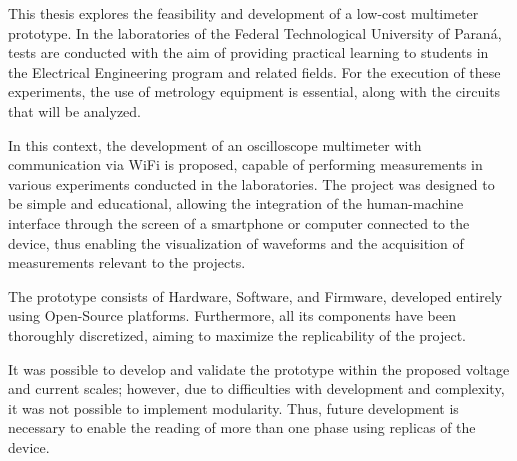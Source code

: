 
\begin{abstractutfpr}%
This thesis explores the feasibility and development of a low-cost multimeter prototype. In the laboratories of the Federal Technological University of Paraná, tests are conducted with the aim of providing practical learning to students in the Electrical Engineering program and related fields. For the execution of these experiments, the use of metrology equipment is essential, along with the circuits that will be analyzed.

In this context, the development of an oscilloscope multimeter with communication via WiFi is proposed, capable of performing measurements in various experiments conducted in the laboratories. The project was designed to be simple and educational, allowing the integration of the human-machine interface through the screen of a smartphone or computer connected to the device, thus enabling the visualization of waveforms and the acquisition of measurements relevant to the projects.

The prototype consists of Hardware, Software, and Firmware, developed entirely using Open-Source platforms. Furthermore, all its components have been thoroughly discretized, aiming to maximize the replicability of the project.

It was possible to develop and validate the prototype within the proposed voltage and current scales; however, due to difficulties with development and complexity, it was not possible to implement modularity. Thus, future development is necessary to enable the reading of more than one phase using replicas of the device.
\end{abstractutfpr}